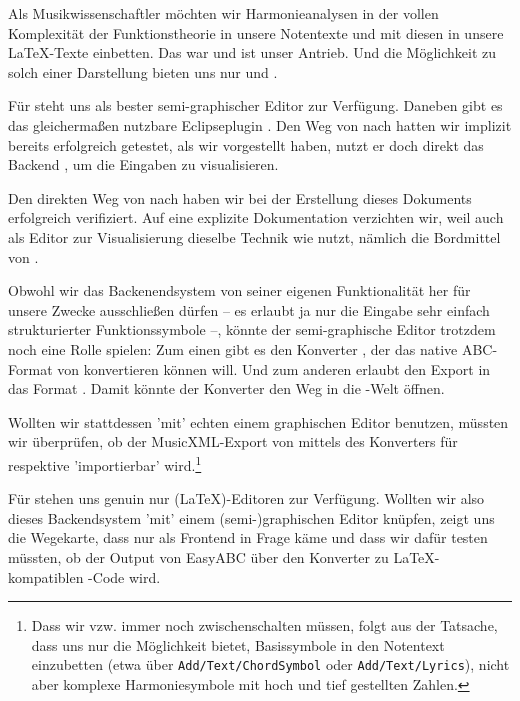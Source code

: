 Als Musikwissenschaftler möchten wir Harmonieanalysen in der vollen Komplexität
der Funktionstheorie in unsere Notentexte und mit diesen in unsere \LaTeX-Texte
einbetten. Das war und ist unser Antrieb. Und die Möglichkeit zu solch einer
Darstellung bieten uns nur  und
.

Für  steht uns  als bester
semi-graphischer Editor zur Verfügung. Daneben gibt es das gleichermaßen
nutzbare Eclipseplugin . Den Weg von  nach
 hatten wir implizit bereits erfolgreich getestet, als wir
 vorgestellt haben, nutzt er doch direkt das Backend
, um die Eingaben zu visualisieren. 

Den direkten Weg von  nach  haben wir bei der
Erstellung dieses Dokuments erfolgreich verifiziert. Auf eine explizite
Dokumentation verzichten wir, weil auch  als Editor zur
Visualisierung dieselbe Technik wie  nutzt, nämlich die
Bordmittel von .

Obwohl wir das Backenendsystem  von seiner eigenen Funktionalität her
für unsere Zwecke ausschließen dürfen -- es erlaubt ja nur die Eingabe sehr
einfach strukturierter Funktionssymbole --, könnte der semi-graphische Editor
 trotzdem noch eine Rolle spielen: Zum einen gibt es den Konverter
, der das native ABC-Format von  konvertieren können
will. Und zum anderen erlaubt  den Export in das Format
. Damit könnte der Konverter  den Weg in die
-Welt öffnen.

Wollten wir  stattdessen 'mit' echten einem graphischen Editor
benutzen, müssten wir überprüfen, ob der MusicXML-Export von 
mittels des Konverters  für  respektive
 'importierbar' wird.\footnote{Dass wir  vzw.
 immer noch zwischenschalten müssen, folgt aus der Tatsache, dass
 uns nur die Möglichkeit bietet, Basissymbole in den Notentext
einzubetten (etwa über \texttt{Add/Text/ChordSymbol} oder
\texttt{Add/Text/Lyrics}), nicht aber komplexe Harmoniesymbole mit hoch und tief
gestellten Zahlen.}

Für  stehen uns genuin nur (\LaTeX)-Editoren zur
Verfügung. Wollten wir also dieses Backendsystem 'mit' einem (semi-)graphischen
Editor knüpfen, zeigt uns die Wegekarte, dass nur  als Frontend in
Frage käme und dass wir dafür testen müssten, ob der Output von EasyABC über den
Konverter  zu \LaTeX-kompatiblen -Code wird.

